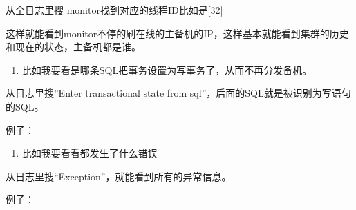 \documentclass[a4,10pt,oneside,english]{sphinxmanual}
\begin{document}
从全日志里搜  monitor找到对应的线程ID比如是{[}32{]}

\begin{sphinxVerbatim}[commandchars=\\\{\}]
 \PYG{l+s+s2}{[32}\PYG{l+s+s2}{]}   
\end{sphinxVerbatim}

这样就能看到monitor不停的刷在线的主备机的IP，这样基本就能看到集群的历史和现在的状态，主备机都是谁。
\begin{enumerate}
%
\setcounter{enumi}{3}
\item {} 
比如我要看是哪条SQL把事务设置为写事务了，从而不再分发备机。

\end{enumerate}

从日志里搜”Enter transactional state from sql”，后面的SQL就是被识别为写语句的SQL。

例子：

\begin{sphinxVerbatim}[commandchars=\\\{\}]
\PYG{p}{[} \PYG{p}{]} \PYG{p}{[}\PYG{p}{]} \PYG{p}{[}\PYG{p}{]}     \PYG{p}{[}    \PYG{p}{]}
\end{sphinxVerbatim}
\begin{enumerate}
%
\setcounter{enumi}{4}
\item {} 
比如我要看看都发生了什么错误

\end{enumerate}

从日志里搜“Exception”，就能看到所有的异常信息。

例子：
\end{document}
